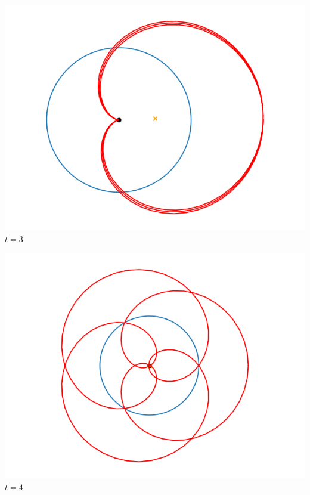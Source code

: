 \documentclass[11pt,class=report,crop=false]{standalone}
\begin{document}
\begin{center}
	\begin{minipage}{0.25\textwidth}
	\center \includegraphics[scale=\myscale,scale=0.3]{figures/fourier-6-300}
	$t = 3$ 
	\end{minipage}
	\begin{minipage}{0.25\textwidth}
	\center \includegraphics[scale=\myscale,scale=0.3]{figures/fourier-6-400}
	$t = 4$ 
	\end{minipage}
	\begin{minipage}{0.25\textwidth}

\end{minipage}
\end{center}
\end{document}
